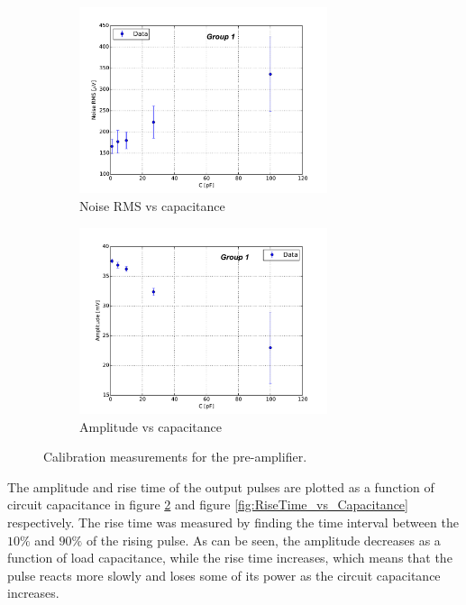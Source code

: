 \documentclass[12pt]{article}
\begin{document}
\begin{figure}[H]
 \centering
  \begin{subfigure}[b]{\textwidth}
    \centering
    \includegraphics[width=0.8\textwidth]{./graphics/noise_vs_capacitance}
    \caption{Noise RMS vs capacitance}
    \label{fig:Noise_vs_Capacitance}
  \end{subfigure}
  
  \begin{subfigure}[b]{\textwidth}
    \centering
    \includegraphics[width=0.8\textwidth]{./graphics/amplitude_vs_capacitance}
    \caption{Amplitude vs capacitance}
    \label{fig:Amplitude_vs_Capacitance}
  \end{subfigure}
  \caption{Calibration measurements for the pre-amplifier.}
  \label{fig:calib_others}
\end{figure}

  The amplitude and rise time of the output pulses are plotted as a function of circuit capacitance in figure \ref{fig:Amplitude_vs_Capacitance} and figure \ref{fig:RiseTime_vs_Capacitance} respectively. The rise time was measured by finding the time interval between the $10\%$ and $90\%$ of the rising pulse. As can be seen, the amplitude decreases as a function of load capacitance, while the rise time increases, which means that the pulse reacts more slowly  and loses some of its power as the circuit capacitance increases.
\end{document}
